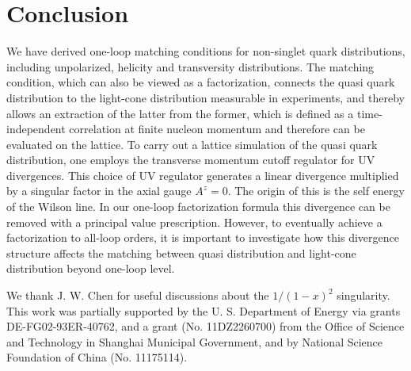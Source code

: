\section{Conclusion}

We have derived one-loop matching conditions for non-singlet quark distributions, including unpolarized, helicity and transversity distributions. The matching condition, which can also be viewed as a factorization, connects the quasi quark distribution to the light-cone distribution measurable in experiments, and thereby allows an extraction of the latter from the former, which is defined as a time-independent correlation at finite nucleon momentum and therefore can be evaluated on the lattice. To carry out a lattice simulation of the quasi quark distribution, one employs the transverse momentum cutoff regulator for UV divergences. This choice of UV regulator generates a linear divergence multiplied by a singular factor in the axial gauge $A^z=0$.
The origin of this is the self energy of the Wilson line. In our one-loop factorization formula this divergence can be removed with a principal value prescription. However, to eventually achieve a factorization to all-loop orders, it is important to
investigate how this divergence structure affects the matching between quasi distribution and light-cone distribution beyond one-loop level.

\begin{acknowledgments}
We thank J. W. Chen for useful discussions about the $1/(1-x)^2$ singularity. This work was partially supported by the U.
S. Department of Energy via grants DE-FG02-93ER-40762, and a grant (No. 11DZ2260700) from the Office of
Science and Technology in Shanghai Municipal Government, and by National Science Foundation of China (No. 11175114).
\end{acknowledgments}
